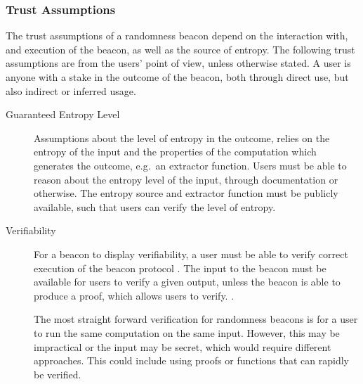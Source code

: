 \subsubsection{Trust Assumptions}\label{ssub:trust_assumptions}
The trust assumptions of a randomness beacon depend on the interaction with, and execution of the beacon, as well as the source of entropy.
The following trust assumptions are from the users' point of view, unless otherwise stated.
A user is anyone with a stake in the outcome of the beacon, both through direct use, but also indirect or inferred usage.
\begin{description}

    \item[Guaranteed Entropy Level]
        Assumptions about the level of entropy in the outcome, relies on the entropy of the input and the properties of the computation which generates the outcome, e.g.\ an extractor function.
        Users must be able to reason about the entropy level of the input, through documentation or otherwise.
        The entropy source and extractor function must be publicly available, such that users can verify the level of entropy.

    \item[Verifiability]
        For a beacon to display verifiability, a user must be able to verify correct execution of the beacon protocol .
        The input to the beacon must be available for users to verify a given output, unless the beacon is able to produce a proof, which allows users to verify. .

        The most straight forward verification for randomness beacons is for a user to run the same computation on the same input.
However, this may be impractical or the input may be secret, which would require different approaches.
This could include using proofs or functions that can rapidly be verified. 


\end{description}
